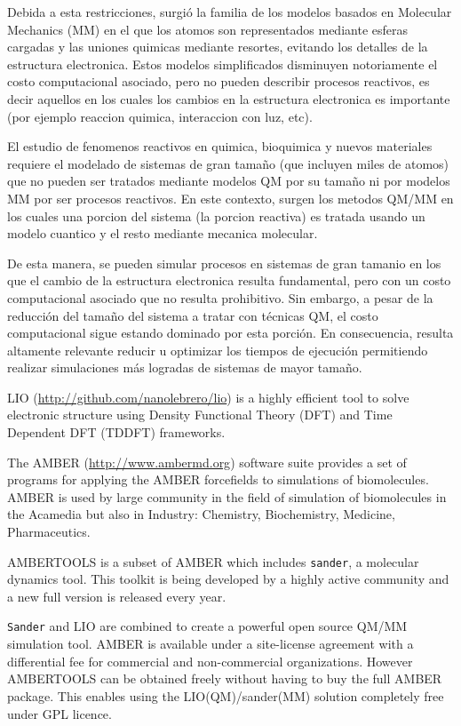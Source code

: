 \documentclass[a4paper,10pt]{article}
\begin{document}
Debida a esta restricciones, surgi\'o la familia de los modelos basados en Molecular Mechanics (MM) en el que los atomos son representados mediante esferas cargadas y las uniones quimicas mediante resortes, evitando los detalles de la estructura electronica.
Estos modelos simplificados disminuyen notoriamente el costo computacional asociado, pero no pueden describir procesos reactivos, es decir aquellos en los cuales los cambios en la estructura electronica es importante (por ejemplo reaccion quimica, interaccion con luz, etc).

El estudio de fenomenos reactivos en quimica, bioquimica y nuevos materiales requiere el modelado de sistemas de gran tama\~no (que incluyen miles de atomos) que no pueden ser tratados mediante modelos QM por su tama\~no ni por modelos MM por ser procesos reactivos.
En este contexto, surgen los metodos QM/MM en los cuales una porcion del sistema (la porcion reactiva) es tratada usando un modelo cuantico y el resto mediante mecanica molecular.

De esta manera, se pueden simular procesos en sistemas de gran tamanio en los que el cambio de la estructura electronica resulta fundamental, pero con un costo computacional asociado que no resulta prohibitivo.
Sin embargo, a pesar de la reducci\'on del tama\~no del sistema a tratar con t\'ecnicas QM, el costo computacional sigue estando dominado por esta porci\'on.
En consecuencia, resulta altamente relevante reducir u optimizar los tiempos de ejecuci\'on permitiendo realizar simulaciones m\'as logradas de sistemas de mayor tama\~no.

LIO (\url{http://github.com/nanolebrero/lio}) is a highly efficient tool to solve electronic structure using Density Functional Theory (DFT) and Time Dependent DFT (TDDFT) frameworks.


The AMBER (\url{http://www.ambermd.org}) software suite provides a set of programs for applying the AMBER forcefields to simulations of biomolecules. 
AMBER is used by large community in the field of simulation of biomolecules in the Acamedia but also in Industry: Chemistry, Biochemistry, Medicine, Pharmaceutics.

AMBERTOOLS is a subset of AMBER which includes \texttt{sander}, a molecular dynamics tool. 
This toolkit is being developed by a highly active community and a new full version is released every year.

\texttt{Sander} and LIO are combined to create a powerful open source QM/MM simulation tool.
AMBER is available under a site-license agreement with a differential fee for commercial and non-commercial organizations.
However AMBERTOOLS can be obtained freely without having to buy the full AMBER package.
This enables using the LIO(QM)/sander(MM) solution completely free under GPL licence.
\end{document}

